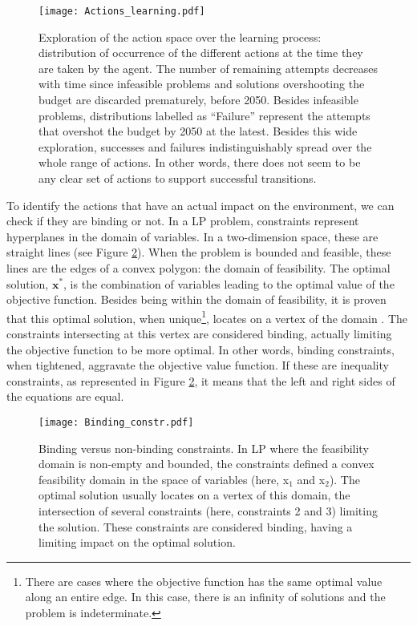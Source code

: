 \begin{figure}[!htbp]
\centering
\texttt{[image: Actions\_learning.pdf]}
\caption{Exploration of the action space over the learning process: distribution of occurrence of the different actions at the time they are taken by the agent. The number of remaining attempts decreases with time since infeasible problems and solutions overshooting the  budget are discarded prematurely, \ie before 2050. Besides infeasible problems, distributions labelled as ``Failure'' represent the attempts that overshot the  budget by 2050 at the latest. Besides this wide exploration, successes and failures indistinguishably spread over the whole range of actions. In other words, there does not seem to be any clear set of actions to support successful transitions.}
\label{fig:Actions_learning}
\end{figure}

To identify the actions that have an actual impact on the environment, we can check if they are binding or not. In a \gls{LP} problem, constraints represent hyperplanes in the domain of variables. In a two-dimension space, these are straight lines (see Figure \ref{fig:Binding_constr}). When the problem is bounded and feasible, these lines are the edges of a convex polygon: the domain of feasibility. The optimal solution, $\textbf{x}^*$, is the combination of variables leading to the optimal value of the objective function. Besides being within the domain of feasibility, it is proven that this optimal solution, when unique\footnote{There are cases where the objective function has the same optimal value along an entire edge. In this case, there is an infinity of solutions and the problem is indeterminate.}, locates on a vertex of the domain \cite{bertsimas1997introduction}. The constraints intersecting at this vertex are considered binding, actually limiting the objective function to be more optimal. In other words, binding constraints, when tightened, aggravate the objective value function. If these are inequality constraints, as represented in Figure \ref{fig:Binding_constr}, it means that the left and right sides of the equations are equal.

\begin{figure}[!htbp]
\centering
\texttt{[image: Binding\_constr.pdf]}
\caption{Binding versus non-binding constraints. In \gls{LP} where the feasibility domain is non-empty and bounded, the constraints defined a convex feasibility domain in the space of variables (here, x$_1$ and x$_2$). The optimal solution usually locates on a vertex of this domain, \ie the intersection of several constraints (here, constraints 2 and 3) limiting the solution. These constraints are considered binding, \ie having a limiting impact on the optimal solution.}
\label{fig:Binding_constr}
\end{figure} 


